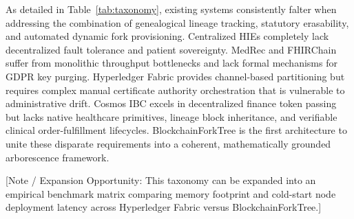 As detailed in Table~\ref{tab:taxonomy}, existing systems consistently falter when addressing the combination of genealogical lineage tracking, statutory erasability, and automated dynamic fork provisioning. Centralized HIEs completely lack decentralized fault tolerance and patient sovereignty. MedRec and FHIRChain suffer from monolithic throughput bottlenecks and lack formal mechanisms for GDPR key purging. Hyperledger Fabric provides channel-based partitioning but requires complex manual certificate authority orchestration that is vulnerable to administrative drift. Cosmos IBC excels in decentralized finance token passing but lacks native healthcare primitives, lineage block inheritance, and verifiable clinical order-fulfillment lifecycles. BlockchainForkTree is the first architecture to unite these disparate requirements into a coherent, mathematically grounded arborescence framework.

[Note / Expansion Opportunity: This taxonomy can be expanded into an empirical benchmark matrix comparing memory footprint and cold-start node deployment latency across Hyperledger Fabric versus BlockchainForkTree.]
